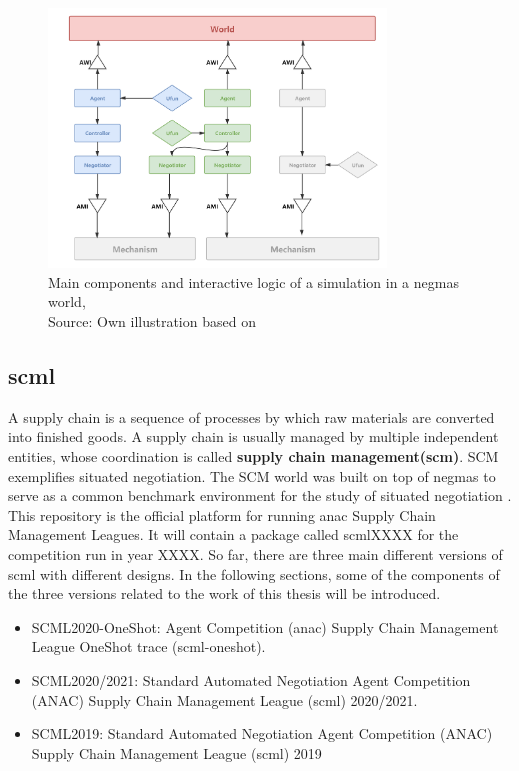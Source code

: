 \begin{figure}[htbp]
\centering
\includegraphics[width=0.8\textwidth]{./images/overview-negmas.png}
\caption{Main components and interactive logic of a simulation in a \gls{negmas} world, \\
Source: Own illustration based on\parencite{Mohammad2019}}
\label{fig:overview-negmas}
\end{figure}

\subsection{\gls{scml}} \label{background-scml}
A supply chain is a sequence of processes by which raw materials are converted into finished goods. A supply chain is usually managed by multiple independent entities, whose coordination is called \textbf{supply chain management(\gls{scm})}. SCM exemplifies situated negotiation. The SCM world was built on top of  \gls{negmas} to serve as a common benchmark environment for the study of situated negotiation \parencite{Mohammad2019}. This repository is the official platform for running \gls{anac} Supply Chain Management Leagues. It will contain a package called scmlXXXX for the competition run in year XXXX. So far, there are three main different versions of \gls{scml} with different designs. In the following sections, some of the components of the three versions related to the work of this thesis will be introduced. 

\begin{itemize}
	\item SCML2020-OneShot: Agent Competition (\gls{anac}) Supply Chain Management League OneShot trace (\gls{scml-oneshot}).
	\item SCML2020/2021: Standard Automated Negotiation Agent Competition (ANAC) Supply Chain Management League (\gls{scml}) 2020/2021.
	\item SCML2019: Standard Automated Negotiation Agent Competition (ANAC) Supply Chain Management League (\gls{scml}) 2019
\end{itemize}

